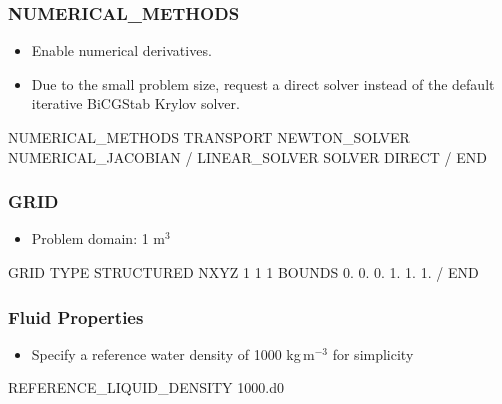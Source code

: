 \documentclass{beamer}
\begin{document}
\begin{frame}[fragile]\frametitle{NUMERICAL\_METHODS}

\begin{itemize}
\item Enable numerical derivatives.
\item Due to the small problem size, request a direct solver instead of the default iterative BiCGStab Krylov solver.
\end{itemize}

\begin{semiverbatim}

NUMERICAL_METHODS TRANSPORT
  NEWTON_SOLVER
    NUMERICAL_JACOBIAN
  /
  LINEAR_SOLVER
    SOLVER DIRECT
  /
END

\end{semiverbatim}

\end{frame}

\begin{frame}\frametitle{GRID}

\begin{itemize}
  \item Problem domain: 1 m$^3$
\end{itemize}

\begin{semiverbatim}

GRID
  TYPE STRUCTURED
  NXYZ 1 1 1
  BOUNDS
    0. 0. 0.
    1. 1. 1.
  /
END
\end{semiverbatim}

\end{frame}

\begin{frame}\frametitle{Fluid Properties}

\begin{itemize}
  \item Specify a reference water density of 1000 kg\,m$^{-3}$ for simplicity
\end{itemize}

\begin{semiverbatim}




REFERENCE_LIQUID_DENSITY 1000.d0

\end{semiverbatim}

\end{frame}
\end{document}
